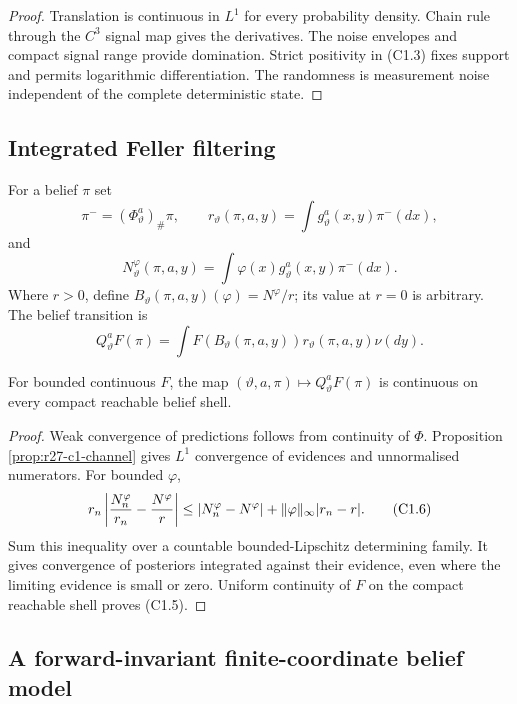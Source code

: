 \begin{proof}
Translation is continuous in $L^1$ for every probability density.  Chain
rule through the $C^3$ signal map gives the derivatives.  The noise envelopes
and compact signal range provide domination.  Strict positivity in (C1.3)
fixes support and permits logarithmic differentiation.  The randomness is
measurement noise independent of the complete deterministic state.
\end{proof}

\subsection{Integrated Feller filtering}

For a belief $\pi$ set
\[
 \pi^-=(\Phi_\vartheta^a)_\#\pi,\qquad
 r_\vartheta(\pi,a,y)=\int g_\vartheta^a(x,y)\pi^-(dx),                  \tag{C1.4}
\]
and
\[
 N_\vartheta^\varphi(\pi,a,y)
 =\int\varphi(x)g_\vartheta^a(x,y)\pi^-(dx).
\]
Where $r>0$, define
$B_\vartheta(\pi,a,y)(\varphi)=N^\varphi/r$; its value at $r=0$ is arbitrary.
The belief transition is
\[
 Q_\vartheta^aF(\pi)
 =\int F(B_\vartheta(\pi,a,y))
       r_\vartheta(\pi,a,y)\nu(dy).                       \tag{C1.5}
\]

\begin{theorem}
\label{thm:r27-c1-feller}
For bounded continuous $F$, the map
$(\vartheta,a,\pi)\mapsto Q_\vartheta^aF(\pi)$ is continuous on every compact
reachable belief shell.
\end{theorem}

\begin{proof}
Weak convergence of predictions follows from continuity of $\Phi$.
Proposition \ref{prop:r27-c1-channel} gives $L^1$ convergence of evidences
and unnormalised numerators.  For bounded $\varphi$,
\[
 r_n\left|{N_n^\varphi\over r_n}-{N^\varphi\over r}\right|
 \le|N_n^\varphi-N^\varphi|+\|\varphi\|_\infty|r_n-r|.    \tag{C1.6}
\]
Sum this inequality over a countable bounded-Lipschitz determining family.
It gives convergence of posteriors integrated against their evidence, even
where the limiting evidence is small or zero.  Uniform continuity of $F$ on
the compact reachable shell proves (C1.5).
\end{proof}

\subsection{A forward-invariant finite-coordinate belief model}

